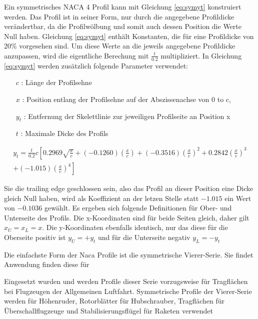 Ein symmetrisches NACA 4 Profil kann mit Gleichung \ref{eq:symyt} konstruiert werden. Das Profil ist in seiner Form, nur durch die angegebene Profildicke ver\"andertbar, da die Profilw\"olbung und somit auch dessen Position die Werte Null haben. Gleichung \ref{eq:symyt} enth\"alt Konstanten, die f\"ur eine Profildicke von 20\% vorgesehen sind. Um diese Werte an die jeweils angegebene Profildicke anzupassen, wird die eigentliche Berechung mit $\frac{t}{0.2}$ multipliziert. In Gleichung \ref{eq:symyt} werden zus\"atzlich folgende Parameter verwendet:

\begin{itemize}
	\item[$c$ :] L\"ange der Profilsehne
	\item[$x$ :] Position entlang der Profilsehne auf der Abszissenachse von 0 to c, 
	\item[$y_t$ :] Entfernung der Skelettlinie zur jeweiligen Profilseite an Position x
	\item[$t$ :] Maximale Dicke des Profils
\end{itemize}


\begin{multline}\label{eq:symyt}
y_t= \frac{t}{0.2}c\left[0.2969 \sqrt{\frac{x}{c}} + (-0.1260) \left(\frac{x}{c}\right) + (-0.3516) \left(\frac{x}{c}\right)^2 + 0.2842 \left(\frac{x}{c}\right)^3 \right. \\\left. + (-1.015) \left(\frac{x}{c}\right)^4 \right]
\end{multline}


Sie die trailing edge geschlossen sein, also das Profil an dieser Position eine Dicke gleich Null haben, wird als Koeffizient an der letzen Stelle statt $-1.015$ ein Wert von $-0.1036$ gew\"ahlt.  Es ergeben sich folgende Definitionen f\"ur Ober- und Unterseite des Profils. Die x-Koordinaten sind f\"ur beide Seiten gleich, daher gilt $x_U = x_L = x$. Die y-Koordinaten ebenfalls identisch, nur das diese f\"ur die Oberseite positiv ist $y_U = +y_t$ und f\"ur die Unterseite negativ $y_L = -y_t$







Die einfachste Form der Naca Profile ist die symmetrische Vierer-Serie. Sie findet  Anwendung finden diese f\"ur 

Eingesetzt wurden und werden Profile dieser Serie vorzugsweise für Tragfl\"achen bei Flugzeugen der Allgemeinen Luftfahrt. Symmetrische Profile der Vierer-Serie werden für H\"ohenruder, Rotorbl\"atter für Hubschrauber, Tragflächen für \"Uberschallflugzeuge und Stabilisierungsfl\"ugel für Raketen verwendet


